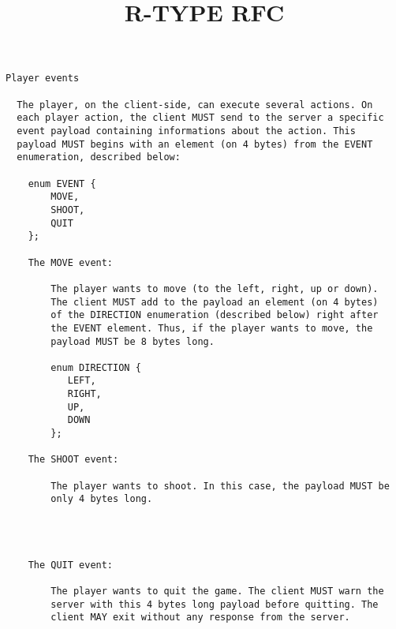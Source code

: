 \documentclass[12pt, letterpaper]{article}\title{R-TYPE RFC}
\begin{document}
\begin{verbatim}
Player events

  The player, on the client-side, can execute several actions. On
  each player action, the client MUST send to the server a specific
  event payload containing informations about the action. This
  payload MUST begins with an element (on 4 bytes) from the EVENT
  enumeration, described below:

    enum EVENT {
        MOVE,
        SHOOT,
        QUIT
    };

    The MOVE event:

        The player wants to move (to the left, right, up or down).
        The client MUST add to the payload an element (on 4 bytes)
        of the DIRECTION enumeration (described below) right after
        the EVENT element. Thus, if the player wants to move, the
        payload MUST be 8 bytes long.

        enum DIRECTION {
           LEFT,
           RIGHT,
           UP,
           DOWN
        };

    The SHOOT event:

        The player wants to shoot. In this case, the payload MUST be
        only 4 bytes long.




    The QUIT event:

        The player wants to quit the game. The client MUST warn the
        server with this 4 bytes long payload before quitting. The
        client MAY exit without any response from the server.
\end{verbatim}
\end{document}

